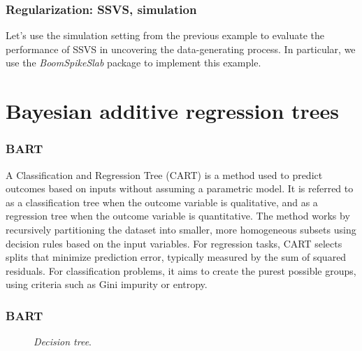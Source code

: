 \documentclass[12pt, compress]{beamer}
\begin{document}
\begin{frame}
	\frametitle{Regularization: SSVS, simulation}
Let's use the simulation setting from the previous example to evaluate the performance of SSVS in uncovering the data-generating process. In particular, we use the \textit{BoomSpikeSlab} package to implement this example.
\end{frame}

\section{Bayesian additive regression trees}

\begin{frame}
	\frametitle{BART}
A Classification and Regression Tree (CART) is a method used to predict outcomes based on inputs without assuming a parametric model. It is referred to as a classification tree when the outcome variable is qualitative, and as a regression tree when the outcome variable is quantitative. The method works by recursively partitioning the dataset into smaller, more homogeneous subsets using decision rules based on the input variables. For regression tasks, CART selects splits that minimize prediction error, typically measured by the sum of squared residuals. For classification problems, it aims to create the purest possible groups, using criteria such as Gini impurity or entropy.
\end{frame}


\begin{frame}
	\frametitle{BART}
\begin{figure}[h!]
	\centering
{}
\caption{\textit{Decision tree}.}
\label{fig:tree}
\end{figure}	

\end{frame}
\end{document}
